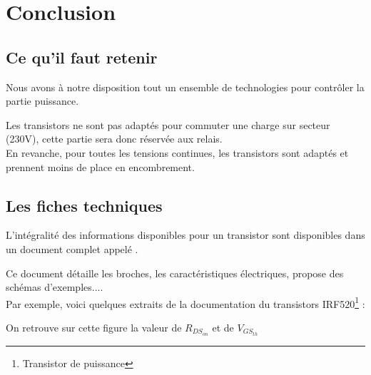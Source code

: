 

 \chapter{Conclusion}

 \section{Ce qu'il faut retenir}

 
 Nous avons à notre disposition tout un ensemble de technologies pour contrôler la partie puissance.

 Les transistors ne sont pas adaptés pour commuter une charge sur secteur (230V), cette partie sera donc réservée aux relais.\\
 En revanche, pour toutes les tensions continues, les transistors sont adaptés et prennent moins de place en encombrement.\\

 \section{Les fiches techniques}

 L'intégralité des informations disponibles pour un transistor sont disponibles dans un document complet appelé .

 Ce document détaille les broches, les caractéristiques électriques, propose des schémas d'exemples....\\

 Par exemple, voici quelques extraits de la documentation du transistors IRF520\footnote{Transistor de puissance} :



 On retrouve sur cette figure la valeur de $R_{DS_{on}}$ et de $V_{GS_{th}}$

